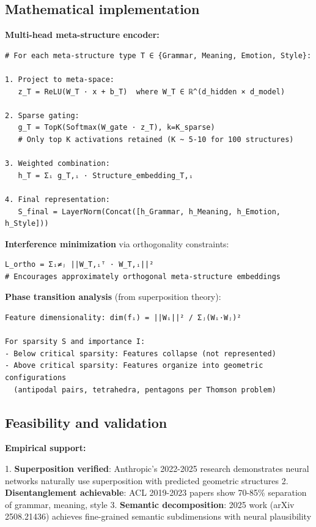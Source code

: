 \documentclass[11pt]{article}
\begin{document}
\subsection{Mathematical implementation}

\textbf{Multi-head meta-structure encoder:}

\begin{verbatim}
# For each meta-structure type T ∈ {Grammar, Meaning, Emotion, Style}:

1. Project to meta-space:
   z_T = ReLU(W_T · x + b_T)  where W_T ∈ ℝ^(d_hidden × d_model)

2. Sparse gating:
   g_T = TopK(Softmax(W_gate · z_T), k=K_sparse)
   # Only top K activations retained (K ~ 5-10 for 100 structures)

3. Weighted combination:
   h_T = Σᵢ g_T,ᵢ · Structure_embedding_T,ᵢ

4. Final representation:
   S_final = LayerNorm(Concat([h_Grammar, h_Meaning, h_Emotion, h_Style]))
\end{verbatim}

\textbf{Interference minimization} via orthogonality constraints:

\begin{verbatim}
L_ortho = Σᵢ≠ⱼ ||W_T,ᵢᵀ · W_T,ᵢ||²
# Encourages approximately orthogonal meta-structure embeddings
\end{verbatim}

\textbf{Phase transition analysis} (from superposition theory):

\begin{verbatim}
Feature dimensionality: dim(fᵢ) = ||Wᵢ||² / Σⱼ(Wᵢ·Wⱼ)²

For sparsity S and importance I:
- Below critical sparsity: Features collapse (not represented)
- Above critical sparsity: Features organize into geometric configurations
  (antipodal pairs, tetrahedra, pentagons per Thomson problem)
\end{verbatim}

\subsection{Feasibility and validation}

\textbf{Empirical support:}

1. \textbf{Superposition verified}: Anthropic's 2022-2025 research demonstrates neural networks naturally use superposition with predicted geometric structures
2. \textbf{Disentanglement achievable}: ACL 2019-2023 papers show 70-85\% separation of grammar, meaning, style
3. \textbf{Semantic decomposition}: 2025 work (arXiv 2508.21436) achieves fine-grained semantic subdimensions with neural plausibility
\end{document}
